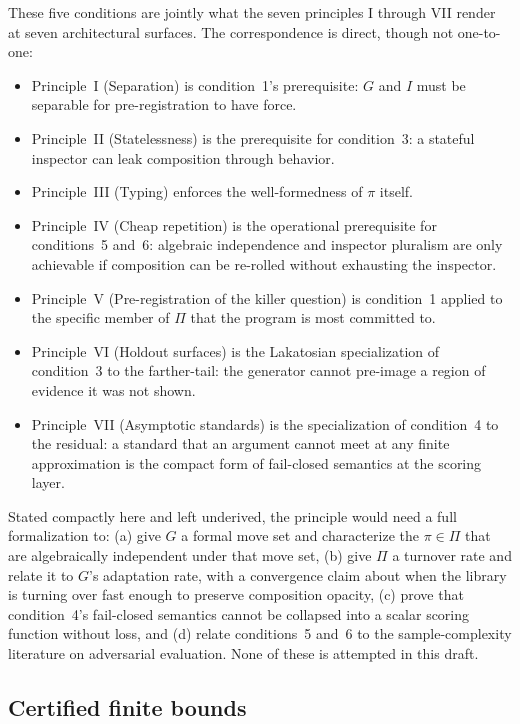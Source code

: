\documentclass[
  11pt,
]{article}
\begin{document}
These five conditions are jointly what the seven principles I through VII
render at seven architectural surfaces. The correspondence is direct,
though not one-to-one:

\begin{itemize}
\item
  Principle~I (Separation) is condition~1's prerequisite: \(G\) and
  \(I\) must be separable for pre-registration to have force.
\item
  Principle~II (Statelessness) is the prerequisite for condition~3: a
  stateful inspector can leak composition through behavior.
\item
  Principle~III (Typing) enforces the well-formedness of \(\pi\) itself.
\item
  Principle~IV (Cheap repetition) is the operational prerequisite for
  conditions~5 and~6: algebraic independence and inspector pluralism are
  only achievable if composition can be re-rolled without exhausting the
  inspector.
\item
  Principle~V (Pre-registration of the killer question) is condition~1
  applied to the specific member of \(\Pi\) that the program is most
  committed to.
\item
  Principle~VI (Holdout surfaces) is the Lakatosian specialization of
  condition~3 to the farther-tail: the generator cannot pre-image a
  region of evidence it was not shown.
\item
  Principle~VII (Asymptotic standards) is the specialization of
  condition~4 to the residual: a standard that an argument cannot meet
  at any finite approximation is the compact form of fail-closed
  semantics at the scoring layer.
\end{itemize}

Stated compactly here and left underived, the principle would need a full
formalization to: (a) give \(G\) a formal move set and
characterize the \(\pi \in \Pi\) that are algebraically independent
under that move set, (b) give \(\Pi\) a turnover rate and relate it to
\(G\)'s adaptation rate, with a convergence claim about when the library
is turning over fast enough to preserve composition opacity, (c) prove
that condition~4's fail-closed semantics cannot be collapsed into a
scalar scoring function without loss, and (d) relate conditions~5 and~6
to the sample-complexity literature on adversarial evaluation. None of
these is attempted in this draft.

\subsection{Certified finite bounds}\label{certified-finite-bounds}
\end{document}
